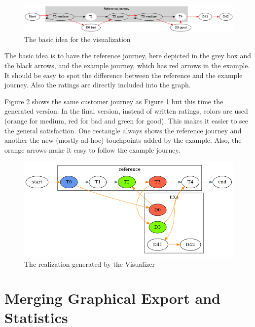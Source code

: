 \documentclass[12pt]{scrartcl}
\begin{document}
\begin{figure}[hbtp]
	\centering
	\includegraphics[scale=0.33]{img/sample_journey1.png}
	\caption{The basic idea for the visualization}
	\label{figure:sample_figure}
\end{figure}

The basic idea is to have the reference journey, here depicted in the grey box and the black arrows, and the 
example journey, which has red arrows in the example. It should be easy to spot the difference between the
reference and the example journey. Also the ratings are directly included into the graph.

Figure \ref{figure:sample_figure2} shows the same customer journey as Figure \ref{figure:sample_figure} but this
time the generated version. In the final version, instead of written ratings, colors are used (orange for
medium, red for bad and green for good). This makes it easier to see the general satisfaction. One rectangle always
shows the reference journey and another the new (mostly ad-hoc) touchpoints added by the example. Also, the orange
arrows make it easy to follow the example journey.

\begin{figure}[hbtp]
	\centering
	\includegraphics[scale=0.5]{img/sample_journey2.png}
	\caption{The realization generated by the Visualizer}
	\label{figure:sample_figure2}
\end{figure}

\section{Merging Graphical Export and Statistics}
\label{section:merge}
\end{document}
